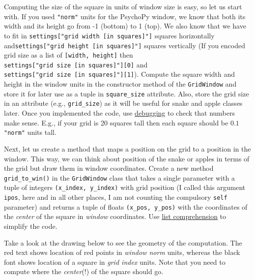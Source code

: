 \documentclass[
]{book}
\begin{document}
Computing the size of the square in units of window size is easy, so let us start with. If you used \texttt{"norm"} units for the PsychoPy window, we know that both its width and its height go from -1 (bottom) to 1 (top). We also know that we have to fit in \texttt{settings{[}"grid\ width\ {[}in\ squares{]}"{]}} squares horizontally and\texttt{settings{[}"grid\ height\ {[}in\ squares{]}"{]}} squares vertically (If you encoded grid size as a list of \texttt{{[}width,\ height{]}} then \texttt{settings{[}"grid\ size\ {[}in\ squares{]}"{]}{[}0{]}} and \texttt{settings{[}"grid\ size\ {[}in\ squares{]}"{]}{[}1{]}}). Compute the square width and height in the window units in the constructor method of the \texttt{GridWindow} and store it for later use as a tuple in \texttt{square\_size} attribute. Also, store the grid size in an attribute (e.g., \texttt{grid\_size}) as it will be useful for snake and apple classes later. Once you implemented the code, use \protect\hyperlink{debugging}{debugging} to check that numbers make sense. E.g., if your grid is 20 squares tall then each square should be \(0.1\) \texttt{"norm"} units tall.

Next, let us create a method that maps a position on the grid to a position in the window. This way, we can think about position of the snake or apples in terms of the grid but draw them in window coordinates. Create a new method \texttt{grid\_to\_win()} in the \texttt{GridWindow} class that takes a single parameter with a tuple of integers \texttt{(x\_index,\ y\_index)} with grid position (I called this argument \texttt{ipos}, here and in all other places, I am not counting the compulsory \texttt{self} parameter) and returns a tuple of floats \texttt{(x\_pos,\ y\_pos)} with the coordinates of the \emph{center} of the square in \emph{window} coordinates. Use \protect\hyperlink{list-comprehension}{list comprehension} to simplify the code.

Take a look at the drawing below to see the geometry of the computation. The red text shows location of red points in \emph{window norm} units, whereas the black font shows location of a square in \emph{grid index} units. Note that you need to compute where the \emph{center}(!) of the square should go.
\end{document}
